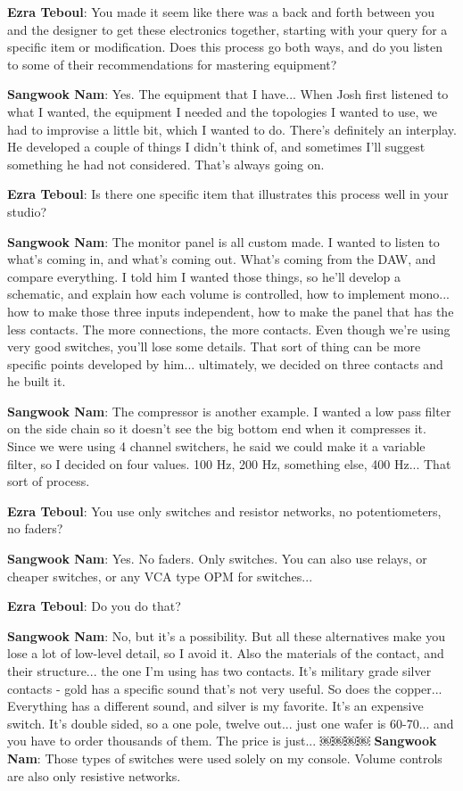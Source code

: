 \textbf{Ezra Teboul}: You made it seem like there was a back and forth between you and the designer to get these electronics together, starting with your query for a specific item or modification. Does this process go both ways, and do you listen to some of their recommendations for mastering equipment?

\textbf{Sangwook Nam}: Yes. The equipment that I have... When Josh first listened to what I wanted, the equipment I needed and the topologies I wanted to use, we had to improvise a little bit, which I wanted to do. There's definitely an interplay. He developed a couple of things I didn't think of, and sometimes I'll suggest something he had not considered. That's always going on.

\textbf{Ezra Teboul}: Is there one specific item that illustrates this process well in your studio?

\textbf{Sangwook Nam}: The monitor panel is all custom made. I wanted to listen to what's coming in, and what's coming out. What's coming from the DAW, and compare everything. I told him I wanted those things, so he'll develop a schematic, and explain how each volume is controlled, how to implement mono... how to make those three inputs independent, how to make the panel that has the less contacts. The more connections, the more contacts. Even though we're using very good switches, you'll lose some details. That sort of thing can be more specific points developed by him... ultimately, we decided on three contacts and he built it.

\textbf{Sangwook Nam}: The compressor is another example. I wanted a low pass filter on the side chain so it doesn't see the big bottom end when it compresses it. Since we were using 4 channel switchers, he said we could make it a variable filter, so I decided on four values. 100 Hz, 200 Hz, something else, 400 Hz... That sort of process.

\textbf{Ezra Teboul}: You use only switches and resistor networks, no potentiometers, no faders?

\textbf{Sangwook Nam}: Yes. No faders. Only switches. You can also use relays, or cheaper switches, or any VCA type OPM for switches...

\textbf{Ezra Teboul}: Do you do that?

\textbf{Sangwook Nam}: No, but it's a possibility. But all these alternatives make you lose a lot of low-level detail, so I avoid it. Also the materials of the contact, and their structure... the one I'm using has two contacts. It's military grade silver contacts - gold has a specific sound that's not very useful. So does the copper... Everything has a different sound, and silver is my favorite. It's an expensive switch. It's double sided, so a one pole, twelve out... just one wafer is 60-70... and you have to order thousands of them. The price is just...
￼￼￼￼
\textbf{Sangwook Nam}: Those types of switches were used solely on my console. Volume controls are also only resistive networks.

